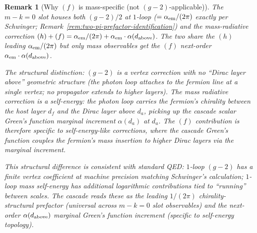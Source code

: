 \documentclass[12pt,a4paper]{article}
\newtheorem*{remark}{Remark}
\begin{document}
\begin{remark}[Why $(f)$ is mass-specific (not $(g{-}2)$-applicable)]\label{rem:mass-specific-f}
The $m{-}k = 0$ slot houses both $(g{-}2)/2$ at $1$-loop
($= \alpha_{\rm em}/(2\pi)$ exactly per Schwinger;
Remark~\ref{rem:two-pi-prefactor-identification}) and the
mass-radiative correction $(h)+(f) = \alpha_{\rm em}/(2\pi) +
\alpha_{\rm em}\cdot\alpha(d_{\rm above})$. The two share the
$(h)$ leading $\alpha_{\rm em}/(2\pi)$ but only mass observables
get the $(f)$ next-order $\alpha_{\rm em}\cdot\alpha(d_{\rm above})$.

The structural distinction: $(g{-}2)$ is a vertex correction with
no ``Dirac layer above'' geometric structure (the photon loop
attaches to the fermion line at a single vertex; no propagator
extends to higher layers). The mass radiative correction is a
self-energy: the photon loop carries the fermion's chirality
between the host layer $d_f$ and the Dirac layer above $d_a$,
picking up the cascade scalar Green's function marginal increment
$\alpha(d_a)$ at $d_a$. The $(f)$ contribution is therefore
specific to self-energy-like corrections, where the cascade
Green's function couples the fermion's mass insertion to higher
Dirac layers via the marginal increment.

This structural difference is consistent with standard QED:
$1$-loop $(g{-}2)$ has a finite vertex coefficient at machine
precision matching Schwinger's calculation; $1$-loop mass
self-energy has additional logarithmic contributions tied to
``running'' between scales. The cascade reads these as the leading
$1/(2\pi)$ chirality-structural prefactor (universal across
$m{-}k = 0$ slot observables) and the next-order
$\alpha(d_{\rm above})$ marginal Green's function increment
(specific to self-energy topology).
\end{remark}
\end{document}
